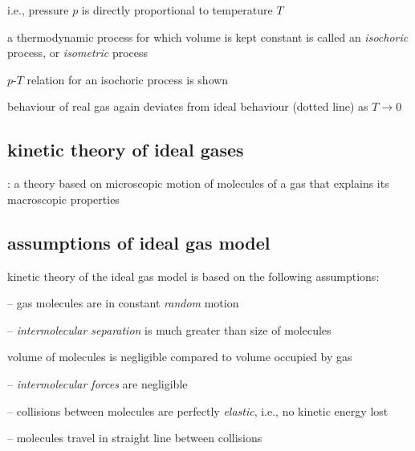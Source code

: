 i.e., pressure $p$ is directly proportional to temperature $T$

\cmt a thermodynamic process for which volume is kept constant is called an \emph{isochoric} process, or \emph{isometric} process

$p$-$T$ relation for an isochoric process is shown

\cmt behaviour of real gas again deviates from ideal behaviour (dotted line) as $T\to0$





\subsection{kinetic theory of ideal gases}

: a theory based on microscopic motion of molecules of a gas that explains its macroscopic properties

\subsection{assumptions of ideal gas model}

\rcyskip

\begin{ilight}
	
kinetic theory of the ideal gas model is based on the following assumptions:

\begin{compactitem}
	
\item[--] gas molecules are in constant \emph{random} motion
	
\item[--] \emph{intermolecular separation} is much greater than size of molecules

volume of molecules is negligible compared to volume occupied by gas

\item[--] \emph{intermolecular forces} are negligible

\item[--] collisions between molecules are perfectly \emph{elastic}, i.e., no kinetic energy lost

\item[--] molecules travel in straight line between collisions
\end{compactitem}

\end{ilight}

